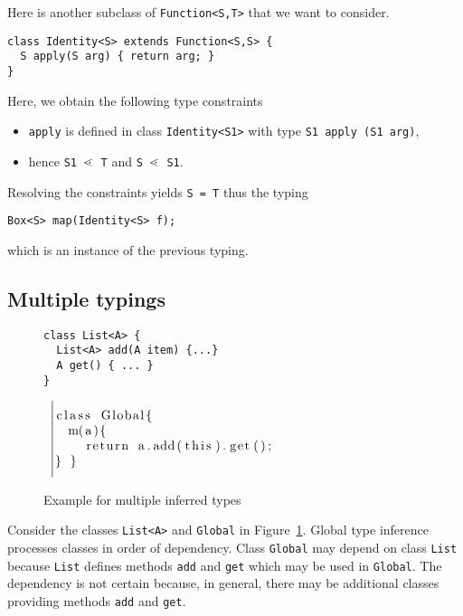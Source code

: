 Here is another subclass of \texttt{Function<S,T>} that we want
to consider.
\begin{lstlisting}
class Identity<S> extends Function<S,S> {
  S apply(S arg) { return arg; }
}
\end{lstlisting}
Here, we obtain the following type constraints
\begin{itemize}
\item \texttt{apply} is defined in class \texttt{Identity<S1>} with
  type \texttt{S1 apply (S1 arg)},
\item hence \texttt{S1 $\lessdot$ T} and \texttt{S $\lessdot$ S1}.
\end{itemize}
Resolving the constraints yields \texttt{S = T} thus the typing
\begin{lstlisting}
Box<S> map(Identity<S> f);
\end{lstlisting}
which is an instance of the previous typing.

\subsection{Multiple typings}
\label{sec:multiple-results}
\begin{figure}[tp]
  \begin{minipage}{0.49\linewidth}
\begin{lstlisting}
class List<A> {
  List<A> add(A item) {...}
  A get() { ... }
}
\end{lstlisting}
  \end{minipage}
  ~$\left|
  \begin{minipage}{0.49\linewidth}
\begin{lstlisting}
class Global{
  m(a){
    return a.add(this).get();
} }
\end{lstlisting}
  \end{minipage}\right.$
  \caption{Example for multiple inferred types}
  \label{fig:example-types-not-unique}
\end{figure}
Consider the classes \texttt{List<A>} and \texttt{Global} in Figure~\ref{fig:example-types-not-unique}.
Global type inference processes classes in order of
dependency. Class \texttt{Global} may depend on
class \texttt{List} because \texttt{List} defines methods \texttt{add} and
\texttt{get} which may be used in \texttt{Global}. The dependency is
not certain because, in general, there may be additional classes
providing methods \texttt{add} and \texttt{get}.

